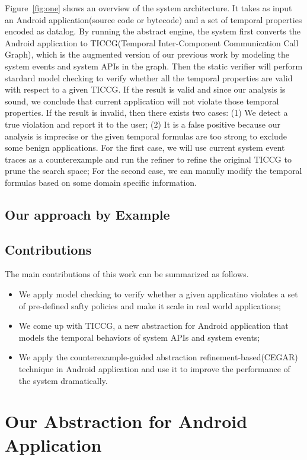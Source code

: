\documentclass{article}
\begin{document}
Figure~\ref{fig:one} shows an overview of the system architecture.
It takes as input an Android application(source code or bytecode) 
and a set of temporal properties encoded as datalog. By running the 
abstract engine, the system first converts the Android application 
to TICCG(Temporal Inter-Component Communication Call Graph), 
which is the augmented version of our previous work\cite{apposcopy}
by modeling the system events and system APIs in the graph. 
Then the static verifier will perform stardard model checking to 
verify whether all the temporal properties are valid with respect 
to a given TICCG. If the result is valid and since our analysis is 
sound, we conclude that current application will not violate those
temporal properties. If the result is invalid, then there exists two
cases: (1) We detect a true violation and report it to the user; 
(2) It is a false positive because our analysis is imprecise or the 
given temporal formulas are too strong to exclude some benign applications.
For the first case, we will use current system event traces as a counterexample
\cite{clarkecegar} and  run the refiner to refine the original 
TICCG to prune the search space; For the second case, we can manully
modify the temporal formulas based on some domain specific information.

\subsection{Our approach by Example}

\subsection{Contributions}
The main contributions of this work can be summarized as follows.
\begin{itemize}
\item We apply model checking to verify whether a given applicatino violates
a set of pre-defined safty policies and make it scale in real world 
applications;
\item We come up with TICCG, a new abstraction for Android application
that models the temporal behaviors of system APIs and system events;
\item We apply the counterexample-guided abstraction refinement-based(CEGAR) 
technique in Android application and use it to improve the performance 
of the system dramatically.
\end{itemize}


\section{Our Abstraction for Android Application}
\end{document}
